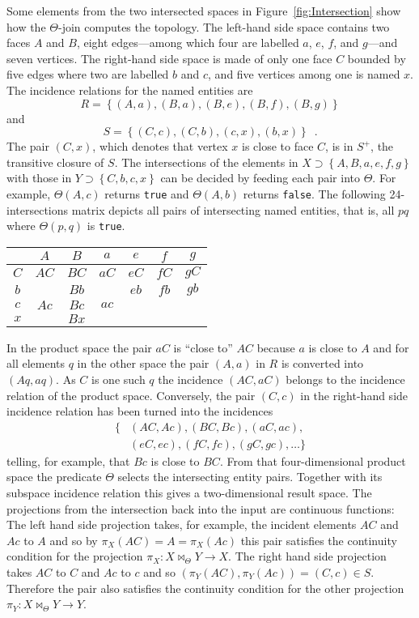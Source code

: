 \documentclass[5p]{elsarticle}
\newcommand{\mathset}[1]{\left\{#1\right\}}
\newcommand{\qq}[1]{``#1''}
\begin{document}
Some elements from the two intersected spaces in Figure~\ref{fig:Intersection} 
show how the $\Theta$-join computes the topology. 
The left-hand side space contains two faces $A$ and $B$, eight edges---among which four are 
labelled $a$, $e$, $f$, and $g$---and seven vertices.  
The right-hand side space is made of only one face $C$ bounded by five edges where two are 
labelled $b$ and $c$, and five vertices among one is named $x$. 
The incidence relations for the named entities are 
$$
 R = \mathset{(A,a),(B,a),(B,e),(B,f),(B,g)}
$$
and 
$$
 S = \mathset{(C,c),(C,b),(c,x),(b,x)}\enspace.
$$
The pair $(C,x)$, which denotes that vertex $x$ is close to face $C$, is in $S^{+}$, the 
transitive closure of $S$. 
The intersections of the elements in $X\supset\mathset{A,B,a,e,f,g}$ with those in 
$Y\supset\mathset{C,b,c,x}$ can be decided by feeding each pair into $\Theta$. 
For example, $\Theta(A,c)$ returns \texttt{true} and $\Theta(A,b)$ returns \texttt{false}. 
The following 24-intersections matrix depicts all pairs of intersecting named entities,  
that is, all $pq$ where $\Theta(p,q)$ is \texttt{true}. 
\begin{center}
\begin{tabular}{c|cccccc}
   & $A$& $B$& $a$& $e$& $f$& $g$\\\hline
$C$&$AC$&$BC$&$aC$&$eC$&$fC$&$gC$\\
$b$&    &$Bb$&    &$eb$&$fb$&$gb$\\
$c$&$Ac$&$Bc$&$ac$&    &    &    \\
$x$&    &$Bx$&    &    &    &    
\end{tabular}
\end{center}
In the product space the pair $aC$ is \qq{close to} $AC$ because $a$ is close to $A$ 
and for all elements $q$ in the other space the pair $(A,a)$ in $R$ is converted into $(Aq,aq)$. 
As $C$ is one such $q$ the incidence $(AC,aC)$ belongs to the incidence relation 
of the product space. 
Conversely, the pair $(C,c)$ in the right-hand side incidence relation has been turned into 
the incidences 
\begin{align*}
  \{&(AC,Ac), (BC,Bc), (aC,ac),\\
    &(eC,ec), (fC,fc), (gC,gc),\dotsc\}
\end{align*}
telling, for example, that $Bc$ is close to $BC$. 
From that four-di\-men\-sio\-nal product space the predicate $\Theta$ selects the intersecting 
entity pairs. Together with its subspace incidence relation this gives a two-dimensional result 
space. 
The projections from the intersection back into the input are continuous functions: 
The left hand side projection takes, for example, the incident elements $AC$ and $Ac$ to $A$ 
and so by ${\pi_X(AC)=A=\pi_X(Ac)}$ this pair satisfies the continuity condition for the 
projection \newline
${\pi_X:X\Join_{\Theta}Y\to X}$. 
The right hand side projection takes $AC$ to $C$ and $Ac$ to $c$ and so 
$(\pi_Y(AC),\pi_Y(Ac)) = (C,c) \in S$. Therefore the pair also satisfies the continuity 
condition for the other projection 
$\pi_Y:X\Join_{\Theta}Y\to Y$. 
\end{document}
